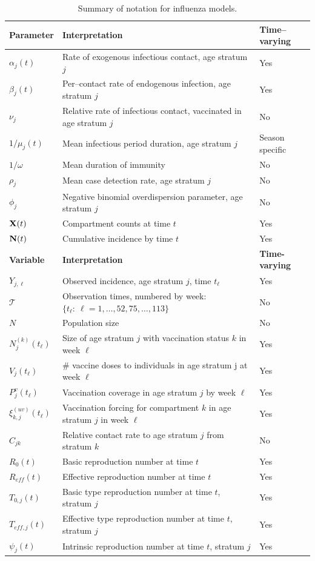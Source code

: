 \begin{table}[htbp]
	\caption{Summary of notation for influenza models.}
	\label{tab:flu_notation}
	\footnotesize
	\centering
	\begin{tabular}{lll}
		\hline
		\textbf{Parameter} & \textbf{Interpretation} & \textbf{Time--varying}\\
		\hline
		$\alpha_j(t)$ & Rate of exogenous infectious contact, age stratum $ j $ & Yes \\
		$ \beta_j(t) $ & Per--contact rate of endogenous infection, age stratum $ j $ & Yes \\
		$ \nu_j $ & Relative rate of infectious contact, vaccinated in age stratum $ j $ & No \\
		$1/\mu_j(t)$ & Mean infectious period duration, age stratum $ j $ & Season specific\\
		$ 1/\omega $ & Mean duration of immunity & No \\
		$ \rho_j $ & Mean case detection rate, age stratum $ j $ & No\\
		$ \phi_j $ & Negative binomial overdispersion parameter, age stratum $ j $ & No \\
		$ \mathbf{X}(t) $ & Compartment counts at time $ t $ & Yes\\
		$ \mathbf{N}(t) $ & Cumulative incidence by time $ t $ & Yes \\
		\hline \hline
		\textbf{Variable} & \textbf{Interpretation} & \textbf{Time-varying}\\
		\hline		
		$ Y_{j,\ell} $ & Observed incidence, age stratum $ j $, time $ t_\ell $ & Yes \\
		$ \mathcal{T} $ & Observation times, numbered by week:  $ \lbrace t_\ell:\ \ell=1,\dots,52,75,\dots,113\rbrace $& No \\
		$ N$ & Population size & No\\
		$ N_{j}^{(k)}(t_\ell) $ & Size of age stratum $ j $ with vaccination status $ k $ in week $ \ell $ & Yes \\
		$ V_{j}(t_\ell) $ & \# vaccine doses to individuals in age stratum j at week $ \ell $ & Yes\\	
		$ P^v_{j}(t_\ell) $ & Vaccination coverage in age stratum $ j $ by week $ \ell $ & Yes \\
		$ \xi_{k,j}^{(uv)}(t_\ell) $ & Vaccination forcing for compartment $ k $ in age stratum $ j $ in week $ \ell $ & Yes\\
		$ C_{jk} $ & Relative contact rate to age stratum $ j $ from stratum $ k $ & No\\
		$ R_0(t) $ & Basic reproduction number at time $ t $ & Yes \\
		$ R_{eff}(t) $ & Effective reproduction number at time $ t $ & Yes \\
		$ T_{0,j}(t) $ & Basic type reproduction number at time $ t $, stratum $ j $ & Yes \\
		$ T_{eff,j}(t) $ & Effective type reproduction number at time $ t $, stratum $ j $ & Yes \\
		$ \psi_j(t) $ & Intrinsic reproduction number at time $ t $, stratum $ j $ & Yes\\
		\hline
	\end{tabular}
\end{table}

